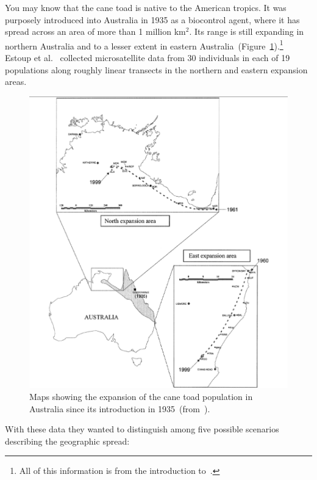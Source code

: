 \documentclass[12pt]{article}
\begin{document}
You may know that the cane toad is native to the American tropics. It
was purposely introduced into Australia in 1935 as a biocontrol agent,
where it has spread across an area of more than 1 million km$^2$. Its
range is still expanding in northern Australia and to a lesser extent
in eastern
Australia~(Figure~\ref{fig:cane-toad-expansion}).\footnote{All of this
  information is from the introduction to~\cite{Estoup-etal-2004}.}
Estoup et al.~\cite{Estoup-etal-2004} collected microsatellite data
from 30 individuals in each of 19 populations along roughly linear
transects in the northern and eastern expansion areas.

\begin{figure}
\begin{center}
\includegraphics[width=6.0in]{cane-toad-expansion.eps}
\end{center}
\caption{Maps showing the expansion of the cane toad population in
  Australia since its introduction in 1935~(from~\cite{Estoup-etal-2004}).}\label{fig:cane-toad-expansion}
\end{figure}

With these data they wanted to distinguish among five possible
scenarios describing the geographic spread:
\end{document}
